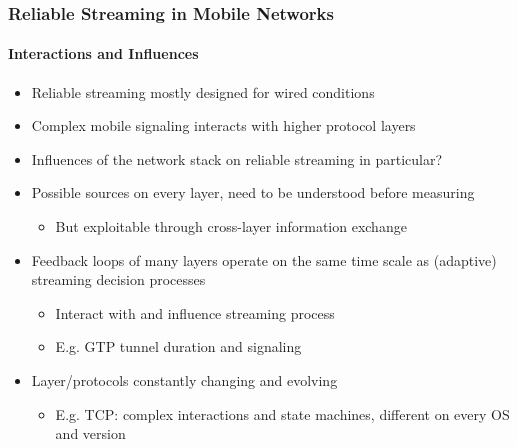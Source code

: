 \documentclass{beamer}
\begin{document}
\begin{frame}
	\frametitle{Reliable Streaming in Mobile Networks}
	\framesubtitle{Interactions and Influences}

	\begin{itemize}
		\item Reliable streaming mostly designed for wired conditions
		\item Complex mobile signaling interacts with higher protocol layers %
		\item Influences of the network stack on reliable streaming in particular?
		\item Possible sources on every layer, need to be understood before measuring
		\begin{itemize}
			\item But exploitable through cross-layer information exchange
		\end{itemize}
	\end{itemize}

	\begin{itemize}[<2->]
		\item Feedback loops of many layers operate on the same time scale as (adaptive) streaming decision processes
		\begin{itemize}
			\item Interact with and influence streaming process
			\item E.g. GTP tunnel duration and signaling
		\end{itemize}
		\item Layer/protocols constantly changing and evolving
		\begin{itemize}
			\item E.g. TCP: complex interactions and state machines, different on every OS and version
		\end{itemize}

	\end{itemize}
\end{frame}


\end{document}
